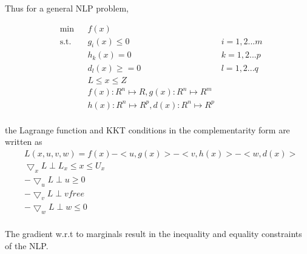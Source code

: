 \documentclass{article}
\begin{document}
Thus for a general NLP problem,

\begin{equation}
\begin{aligned}
&	\min
& & f(x) \\
& \text{s.t.} & & 	 g_{i}(x) \leqslant 0	&	i = 1,2...m \\
& & &			h_{k}(x) = 0	 &	k = 1,2...p \\
& & &			d_{l}(x) \geqslant =0		&	l = 1,2...q \\
& & &			L \leq x \leq Z \\
& & &			f(x): {\!R}^n \mapsto \!R , g(x): {\!R}^n \mapsto {\!R}^m\\
& & &			h(x): {\!R}^n \mapsto {\!R}^ p , d(x): {\!R}^n \mapsto {\!R}^ p\\
\end{aligned}
\end{equation}

\noindent the Lagrange function and KKT conditions in the complementarity form are written as \\

\begin{equation}
\begin{aligned}
& L(x,u,v,w) = f(x) - <u,g(x)> - <v,h(x)> - <w,d(x)>  \\
& \bigtriangledown_x L  \perp L_x \leq x \leq U_x 	\\
& - \bigtriangledown_u L  \perp u \geq 0	\\
& -\bigtriangledown_v L  \perp v free	\\
& -\bigtriangledown_w L  \perp w \leq 0	\\
\end{aligned}
\end{equation}

The gradient w.r.t to marginals result in the inequality and equality constraints of the NLP.
\end{document}
